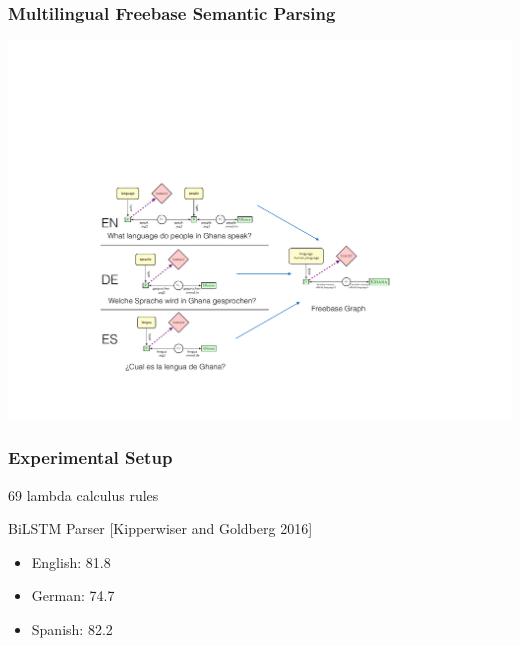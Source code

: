 \documentclass[mathserif,12pt]{beamer}
\newcommand{\hlight}[1]{{\color{blue!80} #1}}
\begin{document}
\begin{frame}
\frametitle{Multilingual Freebase Semantic Parsing}

\includegraphics[scale=0.58]{figures/multilingual-grounding}

\end{frame}

%
%
%
%
%

\begin{frame}
\frametitle{Experimental Setup}
\large
69 lambda calculus rules

\vspace{2em}
BiLSTM Parser {\small [Kipperwiser and Goldberg 2016]}\\
\begin{itemize}
\item English: 81.8 \\
\item German: 74.7 \\
\item Spanish: 82.2 \\
\end{itemize}
\end{frame}
\end{document}
